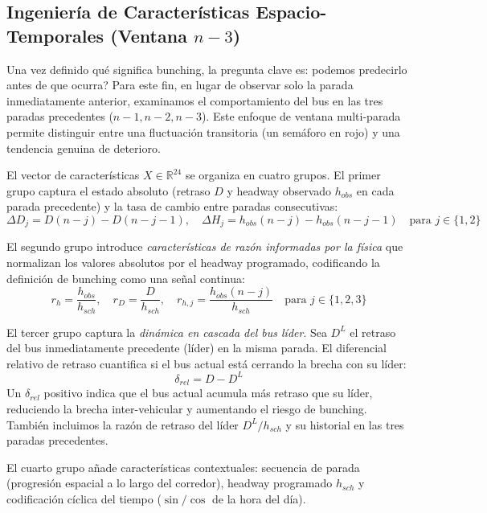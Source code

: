 \documentclass[fleqn,10pt,lineno]{wlpeerj}
\begin{document}
\subsection{Ingenier\'ia de Caracter\'isticas Espacio-Temporales (Ventana $n{-}3$)}

Una vez definido qu\'e significa bunching, la pregunta clave es: \textquestiondown podemos predecirlo antes de que ocurra? Para este fin, en lugar de observar solo la parada inmediatamente anterior, examinamos el comportamiento del bus en las tres paradas precedentes ($n{-}1, n{-}2, n{-}3$). Este enfoque de ventana multi-parada permite distinguir entre una fluctuaci\'on transitoria (un sem\'aforo en rojo) y una tendencia genuina de deterioro.

El vector de caracter\'isticas $X \in \mathbb{R}^{24}$ se organiza en cuatro grupos. El primer grupo captura el estado absoluto (retraso $D$ y headway observado $h_{obs}$ en cada parada precedente) y la tasa de cambio entre paradas consecutivas:
\begin{equation}
  \Delta D_j = D(n-j) - D(n-j-1), \quad \Delta H_j = h_{obs}(n-j) - h_{obs}(n-j-1) \quad \text{para } j \in \{1, 2\}
\end{equation}

El segundo grupo introduce \textit{caracter\'isticas de raz\'on informadas por la f\'isica} que normalizan los valores absolutos por el headway programado, codificando la definici\'on de bunching como una se\~nal continua:
\begin{equation}
  r_h = \frac{h_{obs}}{h_{sch}}, \quad r_D = \frac{D}{h_{sch}}, \quad r_{h,j} = \frac{h_{obs}(n-j)}{h_{sch}} \quad \text{para } j \in \{1,2,3\}
\end{equation}

El tercer grupo captura la \textit{din\'amica en cascada del bus l\'ider}. Sea $D^{L}$ el retraso del bus inmediatamente precedente (l\'ider) en la misma parada. El diferencial relativo de retraso cuantifica si el bus actual est\'a cerrando la brecha con su l\'ider:
\begin{equation}
  \delta_{rel} = D - D^{L}
\end{equation}
Un $\delta_{rel}$ positivo indica que el bus actual acumula m\'as retraso que su l\'ider, reduciendo la brecha inter-vehicular y aumentando el riesgo de bunching. Tambi\'en incluimos la raz\'on de retraso del l\'ider $D^{L}/h_{sch}$ y su historial en las tres paradas precedentes.

El cuarto grupo a\~nade caracter\'isticas contextuales: secuencia de parada (progresi\'on espacial a lo largo del corredor), headway programado $h_{sch}$ y codificaci\'on c\'iclica del tiempo ($\sin/\cos$ de la hora del d\'ia).
\end{document}
